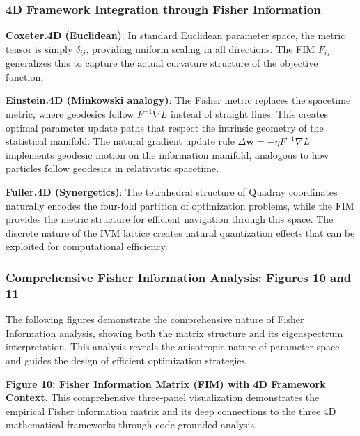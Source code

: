 \documentclass[
  10pt,
]{article}
\begin{document}
\hypertarget{d-framework-integration-through-fisher-information}{%
\subsubsection{4D Framework Integration through Fisher
Information}\label{d-framework-integration-through-fisher-information}}

\textbf{Coxeter.4D (Euclidean)}: In standard Euclidean parameter space,
the metric tensor is simply \(\delta_{ij}\), providing uniform scaling
in all directions. The FIM \(F_{ij}\) generalizes this to capture the
actual curvature structure of the objective function.

\textbf{Einstein.4D (Minkowski analogy)}: The Fisher metric replaces the
spacetime metric, where geodesics follow \(F^{-1}\nabla L\) instead of
straight lines. This creates optimal parameter update paths that respect
the intrinsic geometry of the statistical manifold. The natural gradient
update rule \(\Delta \mathbf{w} = -\eta F^{-1}\nabla L\) implements
geodesic motion on the information manifold, analogous to how particles
follow geodesics in relativistic spacetime.

\textbf{Fuller.4D (Synergetics)}: The tetrahedral structure of Quadray
coordinates naturally encodes the four-fold partition of optimization
problems, while the FIM provides the metric structure for efficient
navigation through this space. The discrete nature of the IVM lattice
creates natural quantization effects that can be exploited for
computational efficiency.

\hypertarget{comprehensive-fisher-information-analysis-figures-10-and-11}{%
\subsubsection{Comprehensive Fisher Information Analysis: Figures 10 and
11}\label{comprehensive-fisher-information-analysis-figures-10-and-11}}

The following figures demonstrate the comprehensive nature of Fisher
Information analysis, showing both the matrix structure and its
eigenspectrum interpretation. This analysis reveals the anisotropic
nature of parameter space and guides the design of efficient
optimization strategies.

\textbf{Figure 10: Fisher Information Matrix (FIM) with 4D Framework
Context}. This comprehensive three-panel visualization demonstrates the
empirical Fisher information matrix and its deep connections to the
three 4D mathematical frameworks through code-grounded analysis.
\end{document}
